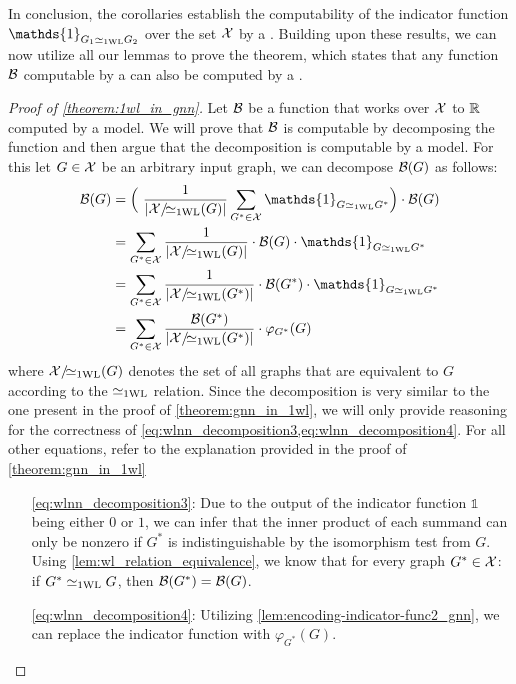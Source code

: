 In conclusion, the corollaries establish the computability of the indicator function $\mathds{1}_{G_1 \wliso G_2}$ over the set $\mathcal{X}$ by a \gnn. Building upon these results, we can now utilize all our lemmas to prove the theorem, which states that any function $\mathcal{B}$ computable by a \wlnn can also be computed by a \gnn.

\begin{proof}[Proof of \cref*{theorem:1wl_in_gnn}]
    Let $\mathcal{B}$ be a function that works over $\mathcal{X}$ to $\mathbb{R}$ computed by a \wlnn model. We will prove that $\mathcal{B}$ is \gnn computable by decomposing the function and then argue that the decomposition is computable by a \gnn model. For this let $G \in \mathcal{X}$ be an arbitrary input graph, we can decompose $\mathcal{B}(G)$ as follows:
    \begin{align}
        \cB(G) &= \Bigl( \ \frac{1}{|\cX/\!{\wliso}(G)|}\sum_{G^* \in \cX} \mathds{1}_{G \wliso G^*} \Bigr) \cdot \cB(G) \nonumber\\
        &= \sum_{G^* \in \cX} \frac{1}{|\cX/\!{\wliso}(G)|} \cdot \cB(G) \cdot \mathds{1}_{G \wliso G^*} \nonumber\\
        &= \sum_{G^* \in \cX} \frac{1}{|\cX/\!{\wliso}(G^*)|} \cdot \cB(G^*) \cdot \mathds{1}_{G \wliso G^*} \label{eq:wlnn_decomposition3}\\
        &= \sum_{G^* \in \cX} \frac{\cB(G^*)}{|\cX/\!{\wliso}(G^*)|}  \cdot \varphi_{G^*}(G) \label{eq:wlnn_decomposition4}
    \end{align}
    where $\mathcal{X}/\!{\simeq_{\text{1WL}}}(G)$ denotes the set of all graphs that are equivalent to $G$ according to the $\simeq_{\text{1WL}}$ relation. Since the decomposition is very similar to the one present in the proof of \cref{theorem:gnn_in_1wl}, we will only provide reasoning for the correctness of \cref{eq:wlnn_decomposition3,eq:wlnn_decomposition4}. For all other equations, refer to the explanation provided in the proof of \cref{theorem:gnn_in_1wl}
    \begin{itemize}[leftmargin=9em]
        \item[\cref*{eq:wlnn_decomposition3}:] Due to the output of the indicator function $\mathds{1}$ being either $0$ or $1$, we can infer that the inner product of each summand can only be nonzero if $G^*$ is indistinguishable by the \wl isomorphism test from $G$. Using \cref{lem:wl_relation_equivalence}, we know that for every graph $G^* \in \mathcal{X}$: if $G^* \simeq_{\text{1WL}} G$, then $\mathcal{B}(G^*) = \mathcal{B}(G)$.
        \item[\cref*{eq:wlnn_decomposition4}:] Utilizing \cref{lem:encoding-indicator-func2_gnn}, we can replace the indicator function with $\varphi_{G^*}(G)$.

\end{itemize}
\end{proof}
